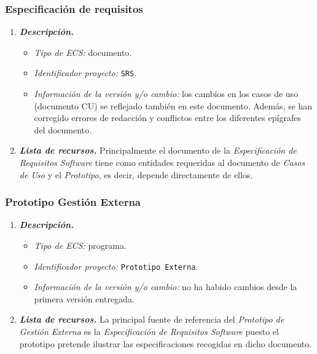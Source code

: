 \documentclass[11pt, a4paper, twoside, titlepage]{article}
\begin{document}
			\subsubsection{Especificación de requisitos \software}
				\begin{enumerate}
					\item {\itshape \bfseries Descripción.}
						\begin{itemize}
							\item \textit{Tipo de ECS:} documento.
							\item \textit{Identificador proyecto:} \verb|SRS|.
							\item \textit{Información de la versión y/o cambio:} los cambios en los casos de uso (documento CU) se reflejado también en este documento. Además, se han corregido errores de redacción y conflictos entre los diferentes epígrafes del documento.
						\end{itemize}

					\item {\itshape \bfseries Lista de recursos.}	
						Principalmente el documento de la {\itshape Especificación de Requisitos Software} tiene como entidades requeridas al documento de {\itshape Casos de Uso} y el {\itshape Prototipo}, es decir, depende directamente de ellos.
				\end{enumerate}

			\subsubsection{Prototipo Gestión Externa}
			\begin{enumerate}
				\item {\itshape \bfseries Descripción.}
						\begin{itemize}
							\item \textit{Tipo de ECS:} programa.
							\item \textit{Identificador proyecto:} \verb|Prototipo Externa|.
							\item \textit{Información de la versión y/o cambio:} no ha habido cambios desde la primera versión entregada.
						\end{itemize}

					\item {\itshape \bfseries Lista de recursos.}
						La principal fuente de referencia del \textit{Prototipo de Gestión Externa} es la \textit{Especificación de Requisitos Software} puesto el prototipo pretende ilustrar las especificaciones recogidas en dicho documento.
				\end{enumerate}
\end{document}
